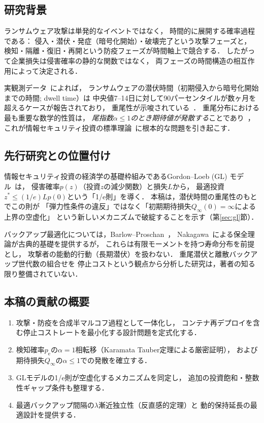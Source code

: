 \documentclass[12pt,a4paper]{article}
\theoremstyle{plain}
\theoremstyle{definition}
\theoremstyle{remark}
\newcommand{\pe}{p_{\mathrm{e}}}
\newcommand{\Qinf}{Q_{\infty}}
\begin{document}
\subsection{研究背景}

ランサムウェア攻撃は単発的なイベントではなく，
時間的に展開する確率過程である：
侵入・潜伏・発症（暗号化開始）・破壊完了という攻撃フェーズと，
検知・隔離・復旧・再開という防疫フェーズが時間軸上で競合する．
したがって企業損失は侵害確率の静的な関数ではなく，
両フェーズの時間構造の相互作用によって決定される．

実観測データ~\cite{mandiant2023,ibm2023}によれば，
ランサムウェアの潜伏時間（初期侵入から暗号化開始までの時間; dwell time）は
中央値7--14日に対して90パーセンタイルが数ヶ月を超えるケースが報告されており，
重尾性が示唆されている~\cite{gruber2022}．
重尾分布における最も重要な数学的性質は，
\emph{尾指数$\alpha\le1$のとき期待値が発散する}ことであり~\cite{embrechts1997}，
これが情報セキュリティ投資の標準理論~\cite{gordon2002}に根本的な問題を引き起こす．

\subsection{先行研究との位置付け}

情報セキュリティ投資の経済学の基礎枠組みであるGordon--Loeb (GL) モデル~\cite{gordon2002}は，
侵害確率$p(z)$（投資$z$の減少関数）と損失$L$から，
最適投資$z^*\le(1/e)Lp(0)$という「1/e則」を導く．
本稿は，潜伏時間の重尾性のもとでこの則が
「弾力性条件の違反」ではなく「初期期待損失$Q_\infty(0)=\infty$による上界の空虚化」
という新しいメカニズムで破綻することを示す（第\ref{sec:gl}節）．

バックアップ最適化については，Barlow--Proschan~\cite{barlow1965}，
Nakagawa~\cite{nakagawa2005}による保全理論が古典的基礎を提供するが，
これらは有限モーメントを持つ寿命分布を前提とし，
攻撃者の能動的行動（長期潜伏）を扱わない．
重尾潜伏と離散バックアップ世代数の組合せを
停止コストという観点から分析した研究は，著者の知る限り整備されていない．

\subsection{本稿の貢献の概要}

\begin{enumerate}[leftmargin=*]
\item 攻撃・防疫を合成半マルコフ過程として一体化し，
  コンテナ再デプロイを含む停止コストレートを最小化する設計問題を定式化する．
\item 検知確率$\pe$の$\alpha=1$相転移（Karamata Tauber定理による厳密証明），
  および期待損失$\Qinf$の$\alpha\le1$での発散を確立する．
\item GLモデルの1/e則が空虚化するメカニズムを同定し，
  追加の投資飽和・整数性ギャップ条件も整理する．
\item 最適バックアップ間隔の$\lambda$漸近独立性（反直感的定理）と
  動的保持延長の最適設計を提供する．
\end{enumerate}
\end{document}
